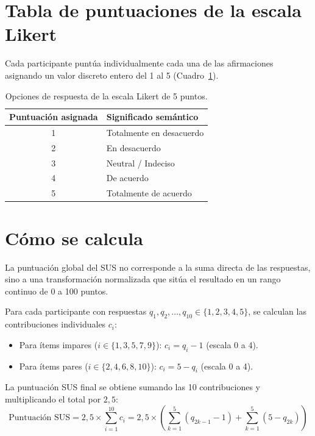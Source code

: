 \documentclass[11pt,a4paper]{article}
\begin{document}
\section{Tabla de puntuaciones de la escala Likert}
Cada participante puntúa individualmente cada una de las afirmaciones asignando un valor discreto entero del 1 al 5 (Cuadro~\ref{tab:likert-escala}).

\begin{table}[htbp]
\centering
\begin{tabular}{cl}
\toprule
\textbf{Puntuación asignada} & \textbf{Significado semántico} \\
\midrule
1 & Totalmente en desacuerdo \\
2 & En desacuerdo \\
3 & Neutral / Indeciso \\
4 & De acuerdo \\
5 & Totalmente de acuerdo \\
\bottomrule
\end{tabular}
\caption{Opciones de respuesta de la escala Likert de 5 puntos.}
\label{tab:likert-escala}
\end{table}

\section{Cómo se calcula}
La puntuación global del SUS no corresponde a la suma directa de las respuestas, sino a una transformación normalizada que sitúa el resultado en un rango continuo de 0 a 100 puntos.

Para cada participante con respuestas $q_1, q_2, \dots, q_{10} \in \{1, 2, 3, 4, 5\}$, se calculan las contribuciones individuales $c_i$:
\begin{itemize}
    \item Para ítems impares ($i \in \{1, 3, 5, 7, 9\}$): $c_i = q_i - 1$ (escala 0 a 4).
    \item Para ítems pares ($i \in \{2, 4, 6, 8, 10\}$): $c_i = 5 - q_i$ (escala 0 a 4).
\end{itemize}

La puntuación SUS final se obtiene sumando las 10 contribuciones y multiplicando el total por $2{,}5$:
\begin{equation}
\text{Puntuación SUS} = 2{,}5 \times \sum_{i=1}^{10} c_i = 2{,}5 \times \left( \sum_{k=1}^5 (q_{2k-1} - 1) + \sum_{k=1}^5 (5 - q_{2k}) \right)
\end{equation}
\end{document}
